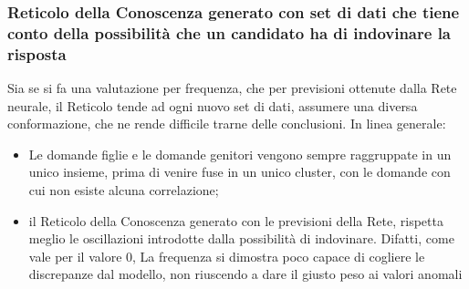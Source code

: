 \subsubsection{Reticolo della Conoscenza generato con set di dati che tiene conto della possibilit\`a che un candidato ha di indovinare la risposta}
\label{Reticolo della Conoscenza generato con set di dati che tiene conto della possibilita che un candidato ha di indovinare la risposta}
Sia se si fa una valutazione per frequenza, che per previsioni ottenute dalla Rete neurale, il Reticolo tende ad ogni nuovo set di dati, assumere una diversa conformazione, che ne rende difficile trarne delle conclusioni.
In linea generale:
\begin{itemize}
\item Le domande figlie e le domande genitori vengono sempre raggruppate in un unico insieme, prima di venire fuse in un unico cluster, con le domande con cui non esiste alcuna correlazione;
\item il Reticolo della Conoscenza generato con le previsioni della Rete, rispetta meglio le oscillazioni introdotte dalla possibilit\`a di indovinare. Difatti, come vale per il valore 0, La frequenza si dimostra poco capace di cogliere le discrepanze dal modello, non riuscendo a dare il giusto peso ai valori anomali
\end{itemize}

